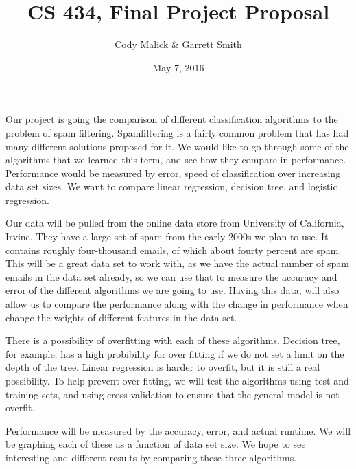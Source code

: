 \documentclass[10pt,letterpaper]{article}
\begin{document}
  \title{CS 434, Final Project Proposal}
  \author{Cody Malick \& Garrett Smith }

  \date{May 7, 2016}
  \maketitle
  
  Our project is going the comparison of different classification algorithms to the problem of spam filtering. Spamfiltering is a fairly common problem that has had many different solutions proposed for it. We would like to go through some of the algorithms that we learned this term, and see how they compare in performance. Performance would be measured by error, speed of classification over increasing data set sizes. We want to compare linear regression, decision tree, and logistic regression. 

  Our data will be pulled from the online data store from University of California, Irvine. They have a large set of spam from the early 2000s we plan to use. It contains roughly four-thousand emails, of which about fourty percent are spam. This will be a great data set to work with, as we have the actual number of spam emails in the data set already, so we can use that to measure the accuracy and error of the different algorithms we are going to use. Having this data, will also allow us to compare the performance along with the change in performance when change the weights of different features in the data set.

  There is a possibility of overfitting with each of these algorithms. Decision tree, for example, has a high probibility for over fitting if we do not set a limit on the depth of the tree. Linear regression is harder to overfit, but it is still a real possibility. To help prevent over fitting, we will test the algorithms using test and training sets, and using cross-validation to ensure that the general model is not overfit.

  Performance will be measured by the accuracy, error, and actual runtime. We will be graphing each of these as a function of data set size. We hope to see interesting and different results by comparing these three algorithms. 
   
\end{document}
